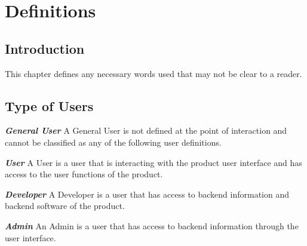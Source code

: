 \chapter{Definitions}

\section{Introduction}
This chapter defines any necessary words used that may not be clear to a reader.

\section{Type of Users}
\textbf{\em{General User}}\newline
A General User is not defined at the point of interaction and cannot be classified as any of the following user 
definitions.\newline

\textbf{\em{User}}\newline
A User is a user that is interacting with the product user interface and has access to the user functions of the 
product.\newline

\textbf{\em{Developer}}\newline
A Developer is a user that has access to backend information and backend software of the product.\newline

\textbf{\em{Admin}}\newline
An Admin is a user that has access to backend information through the user interface.